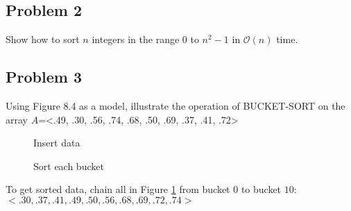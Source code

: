 \documentclass[a4paper]{article}
\makeatletter
\def\LinkedList#1{%
  \foreach \element in \list {
     \node[node of list, right = of aux, name=ele] {\element};
     \draw[link] (aux) -- (ele);
     \coordinate (aux) at (ele.east);
  }
}
\newenvironment{solution}
  {\begin{proof}[Solution]}
  {\end{proof}}
\renewenvironment{proof}[1][\proofname]{%
  \par\pushQED{\qed}\normalfont%
  \topsep6\p@\@plus6\p@\relax
  \trivlist\item[\hskip\labelsep\bfseries#1\@addpunct{.}]%
  \ignorespaces
}{%
  \popQED\endtrivlist\@endpefalse
}
\makeatother
\begin{document}
\subsection*{Problem 2}
Show how to sort $n$ integers in the range $0$ to $n^2-1$ in $\mathcal{O}(n)$ time.
\begin{solution}
\end{solution}

\subsection*{Problem 3}
Using Figure 8.4 as a model, illustrate the operation of BUCKET-SORT on the array $A$=<.49, .30, .56, .74, .68, .50, .69, .37, .41, .72>
\begin{figure}[H]
\centering
\begin{minipage}{5cm}
\caption{Insert data}
\end{minipage}
\qquad
\begin{minipage}{5cm}
\caption{Sort each bucket}
\label{bucket}
\end{minipage}
\end{figure}

\begin{solution}
To get sorted data, chain all in Figure \ref{bucket} from bucket $0$ to bucket $10$: \\
$<.30, .37, .41, .49, .50, .56, .68, .69, .72, .74>$
\end{solution}
\end{document}
